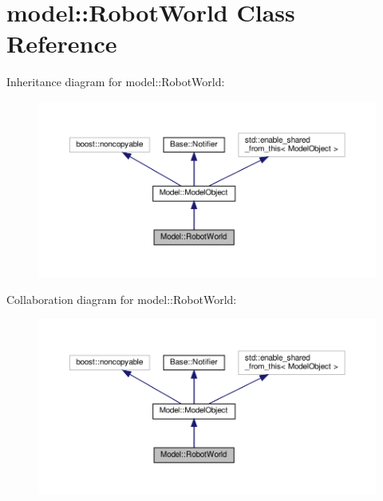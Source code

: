 \hypertarget{class_model_1_1_robot_world}{}\section{model\+:\+:Robot\+World Class Reference}
\label{class_model_1_1_robot_world}


Inheritance diagram for model\+:\+:Robot\+World\+:
\nopagebreak
\begin{figure}[H]
\begin{center}
\leavevmode
\includegraphics[width=350pt]{class_model_1_1_robot_world__inherit__graph}
\end{center}
\end{figure}


Collaboration diagram for model\+:\+:Robot\+World\+:
\nopagebreak
\begin{figure}[H]
\begin{center}
\leavevmode
\includegraphics[width=350pt]{class_model_1_1_robot_world__coll__graph}
\end{center}
\end{figure}
